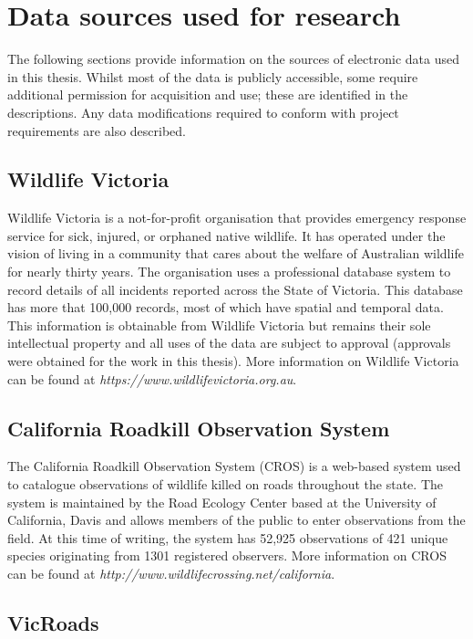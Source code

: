 \chapter{Data sources used for research}\label{apx:C}
\newpage

The following sections provide information on the sources of electronic data used in this thesis. Whilst most of the data is publicly accessible, some require additional permission for acquisition and use; these are identified in the descriptions. Any data modifications required to conform with project requirements are also described.

\section{Wildlife Victoria}

Wildlife Victoria is a not-for-profit organisation that provides emergency response service for sick, injured, or orphaned native wildlife. It has operated under the vision of living in a community that cares about the welfare of Australian wildlife for nearly thirty years. The organisation uses a professional database system to record details of all incidents reported across the State of Victoria. This database has more that 100,000 records, most of which have spatial and temporal data. This information is obtainable from Wildlife Victoria but remains their sole intellectual property and all uses of the data are subject to approval (approvals were obtained for the work in this thesis). More information on Wildlife Victoria can be found at \textit{https://www.wildlifevictoria.org.au}.

\section{California Roadkill Observation System}

The California Roadkill Observation System (CROS) is a web-based system used to catalogue observations of wildlife killed on roads throughout the state. The system is maintained by the Road Ecology Center based at the University of California, Davis and allows members of the public to enter observations from the field. At this time of writing, the system has 52,925 observations of 421 unique species originating from 1301 registered observers. More information on CROS can be found at \textit{http://www.wildlifecrossing.net/california}.

\section{VicRoads}

